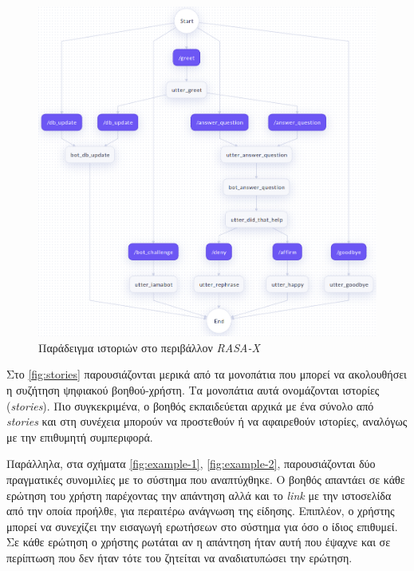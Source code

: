 \begin{figure}[!ht]
  \centering
  \captionsetup{justification=centering}
  \includegraphics[width=1\textwidth]{images/chapter4/stories.png}
  \caption{Παράδειγμα ιστοριών στο περιβάλλον \emph{RASA-X}}
  \label{fig:stories}
\end{figure}
\noindent

Στο \autoref{fig:stories} παρουσιάζονται μερικά από τα μονοπάτια που μπορεί να ακολουθήσει η συζήτηση ψηφιακού βοηθού-χρήστη. Τα μονοπάτια αυτά ονομάζονται ιστορίες (\emph{stories}). Πιο συγκεκριμένα, ο βοηθός εκπαιδεύεται αρχικά με ένα σύνολο από \emph{stories} και στη συνέχεια μπορούν να προστεθούν ή να αφαιρεθούν ιστορίες, αναλόγως με την επιθυμητή συμπεριφορά.


Παράλληλα, στα σχήματα \ref{fig:example-1}, \ref{fig:example-2}, παρουσιάζονται δύο πραγματικές συνομιλίες με το σύστημα που αναπτύχθηκε. Ο βοηθός απαντάει σε κάθε ερώτηση του χρήστη παρέχοντας την απάντηση αλλά και το \emph{link} με την ιστοσελίδα από την οποία προήλθε, για περαιτέρω ανάγνωση της είδησης. Επιπλέον, ο χρήστης μπορεί να συνεχίζει την εισαγωγή ερωτήσεων στο σύστημα για όσο ο ίδιος επιθυμεί. Σε κάθε ερώτηση ο χρήστης ρωτάται αν η απάντηση ήταν αυτή που έψαχνε και σε περίπτωση που δεν ήταν τότε του ζητείται να αναδιατυπώσει την ερώτηση.

